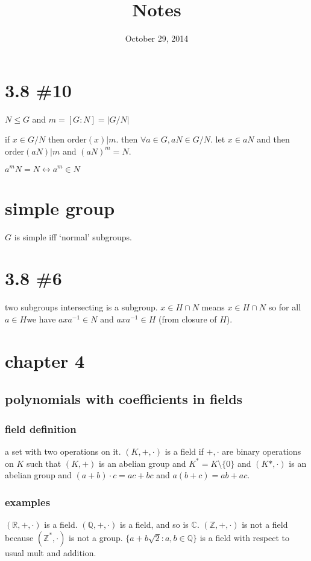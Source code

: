 \documentclass[letterpaper]{article}
\begin{document}
\title{Notes}
\date{October 29, 2014}
\maketitle
\section*{3.8 \#10}
$N\le G$ and $m=[G:N]=|G/N|$

if $x\in G/N$ then $\text{order}(x)|m$. then $\forall a\in G, aN\in G/N$. let $x\in aN$ and then $\text{order}(aN)|m$ and $(aN)^m=N$.

$a^mN=N\leftrightarrow a^m\in N$

\section*{simple group}
$G$ is simple iff `normal' subgroups.

\section*{3.8 \#6}
two subgroups intersecting is a subgroup.  $x\in H\cap N$ means $x\in H\cap N$ so for all $a\in H$we have $axa^{-1}\in N$ and $axa^{-1}\in H$ (from closure of $H$).

\section*{chapter 4}
\subsection*{polynomials with coefficients in fields}
\subsubsection*{field definition}
a set with two operations on it. $(K,+,\cdot)$ is a field if $+,\cdot$ are binary operations on $K$ such that $(K,+)$ is an abelian group and $K^*=K\setminus\{0\}$ and $(K*,\cdot)$ is an abelian group and $(a+b)\cdot c=ac+bc$ and $a(b+c)=ab+ac$.

\subsubsection*{examples}
$(\mathbb{R},+,\cdot)$ is a field. $(\mathbb{Q},+,\cdot)$ is a field, and so is $\mathbb{C}$.  $(\mathbb{Z},+,\cdot)$ is not a field because $(\mathbb{Z}^*,\cdot)$ is not a group. $\{a+b\sqrt{2}:a,b\in\mathbb{Q}\}$ is a field with respect to usual mult and addition.
\end{document}
